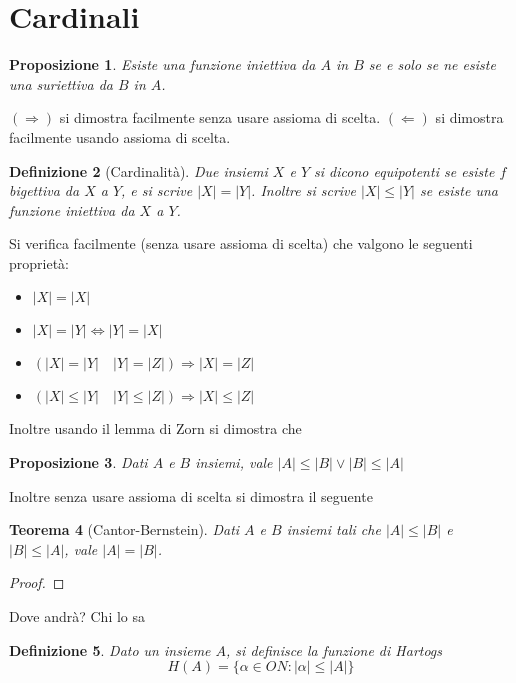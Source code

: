 \documentclass[a4paper,10pt,oneside]{article}
\newcommand{\abs}[1]{\left|#1\right|}
\theoremstyle{plain}
\newtheorem{mytheorem}{Teorema}[section]
\newtheorem{mydef}[mytheorem]{Definizione}
\newtheorem{myprop}[mytheorem]{Proposizione}
\theoremstyle{definition}
\theoremstyle{remark}
\begin{document}
\section{Cardinali}

\begin{myprop}
 Esiste una funzione iniettiva da $A$ in $B$ se e solo se ne esiste una suriettiva da $B$ in $A$.
\end{myprop}
$(\Rightarrow)$ si dimostra facilmente senza usare assioma di scelta. $(\Leftarrow)$ si dimostra facilmente usando assioma di scelta.

\begin{mydef}[Cardinalità]
 Due insiemi $X$ e $Y$ si dicono equipotenti se esiste $f$ bigettiva da $X$ a $Y$, e si scrive $\abs X=\abs Y$. Inoltre si scrive $\abs X \le \abs Y$ se esiste una funzione iniettiva da $X$ a $Y$.
\end{mydef}

Si verifica facilmente (senza usare assioma di scelta) che valgono le seguenti proprietà:

\begin{itemize}
 \item $\abs X=\abs X$
 \item $\abs X=\abs Y \Leftrightarrow \abs Y=\abs X$
 \item $(\abs X=\abs Y \quad \abs Y=\abs Z) \Rightarrow \abs X=\abs Z$
 \item $(\abs X \le \abs Y \quad \abs Y \le \abs Z)\Rightarrow \abs X \le \abs Z$
\end{itemize}

Inoltre usando il lemma di Zorn si dimostra che

\begin{myprop}
 Dati $A$ e $B$ insiemi, vale $\abs A\le\abs B \vee \abs B\le\abs A$
\end{myprop}

Inoltre senza usare assioma di scelta si dimostra il seguente

\begin{mytheorem}[Cantor-Bernstein]
 Dati $A$ e $B$ insiemi tali che $\abs A\le\abs B$ e $\abs B\le\abs A$, vale $\abs A=\abs B$.
\end{mytheorem}
\begin{proof}
 
\end{proof}


Dove andrà? Chi lo sa
\begin{mydef}
 Dato un insieme $A$, si definisce la funzione di Hartogs \[H(A)=\{\alpha \in ON:|\alpha|\le|A|\}\]
\end{mydef}
\end{document}
